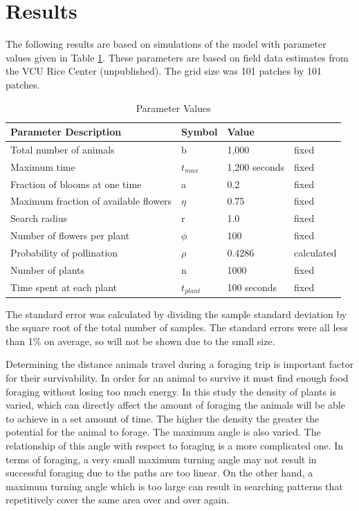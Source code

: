 \documentclass{tran-l}
\theoremstyle{definition}
\theoremstyle{remark}
\numberwithin{equation}{subsection}
\begin{document}
\section{{\bf Results}}
The following results are based on simulations of the model with parameter values given in Table \ref{parameter}.  These parameters are based on field data estimates from the VCU Rice Center (unpublished).  The grid size was 101 patches by 101 patches.
\begin{table}
\begin{tabular}{|l|l|l|l|}
  \hline
  Parameter Description & Symbol & Value &  \\ \hline  \label{parameter}
  Total number of animals & b & 1,000 & fixed  \\ \hline
  Maximum time & $t_{max}$ & 1,200 seconds & fixed \\ \hline
  Fraction of blooms at one time & a & 0.2 & fixed \\ \hline
  Maximum fraction of available flowers & $\eta$ & 0.75 & fixed \\ \hline
  Search radius & r & 1.0 & fixed \\ \hline
  Number of flowers per plant & $\phi$ & 100 & fixed \\ \hline
  Probability of pollination   & $\rho$ & 0.4286 & calculated \\ \hline
  Number of plants & n & 1000 & fixed \\ \hline
  Time spent at each plant & $t_{plant}$ & 100 seconds & fixed \\ \hline
\end{tabular}
\caption{Parameter Values}
\end{table}

The standard error was calculated by dividing the sample standard deviation
 by the square root of the total number of samples.   The standard errors were all less than
1\% on average, so will not be shown due to the small size.


Determining the distance animals travel during a foraging trip is important factor for their survivability.  In order for an animal to survive it must find enough food foraging without losing too much energy.  In this study the density of plants is varied, which can directly affect the amount of foraging the animals will be able to achieve in a set amount of time.  The higher the density the greater the potential for the animal to forage.  The maximum angle is also varied.  The relationship of this angle with respect to foraging is a more complicated one.  In terms of foraging, a very small maximum turning angle may not result in successful foraging due to the paths are too linear.  On the other hand, a maximum turning angle which is too large can result in searching patterns that repetitively cover the same area over and over again.
\end{document}

